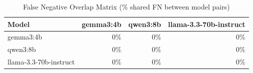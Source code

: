 \begin{table}[ht]
\centering
\caption{False Negative Overlap Matrix (\% shared FN between model pairs)}
\label{tab:e2_fn_overlap}
\begin{tabular}{lrrr}
\toprule
Model & gemma3:4b & qwen3:8b & llama-3.3-70b-instruct \\
\midrule
gemma3:4b & 0\% & 0\% & 0\% \\
qwen3:8b & 0\% & 0\% & 0\% \\
llama-3.3-70b-instruct & 0\% & 0\% & 0\% \\
\bottomrule
\end{tabular}
\end{table}